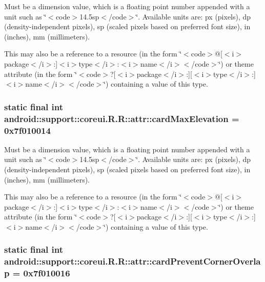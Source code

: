 Must be a dimension value, which is a floating point number appended with a unit such as \char`\"{}$<$code$>$14.5sp$<$/code$>$\char`\"{}. Available units are: px (pixels), dp (density-independent pixels), sp (scaled pixels based on preferred font size), in (inches), mm (millimeters). 

This may also be a reference to a resource (in the form \char`\"{}$<$code$>$@\mbox{[}$<$i$>$package$<$/i$>$:\mbox{]}$<$i$>$type$<$/i$>$:$<$i$>$name$<$/i$>$$<$/code$>$\char`\"{}) or theme attribute (in the form \char`\"{}$<$code$>$?\mbox{[}$<$i$>$package$<$/i$>$:\mbox{]}\mbox{[}$<$i$>$type$<$/i$>$:\mbox{]}$<$i$>$name$<$/i$>$$<$/code$>$\char`\"{}) containing a value of this type. \hypertarget{classandroid_1_1support_1_1coreui_1_1_r_1_1attr_0b3ead5ededfc7aa2b9083c1c0a5d37b}{
\subsubsection[{cardMaxElevation}]{\setlength{\rightskip}{0pt plus 5cm}static final int android::support::coreui.R.R::attr::cardMaxElevation = 0x7f010014}}
\label{classandroid_1_1support_1_1coreui_1_1_r_1_1attr_0b3ead5ededfc7aa2b9083c1c0a5d37b}


Must be a dimension value, which is a floating point number appended with a unit such as \char`\"{}$<$code$>$14.5sp$<$/code$>$\char`\"{}. Available units are: px (pixels), dp (density-independent pixels), sp (scaled pixels based on preferred font size), in (inches), mm (millimeters). 

This may also be a reference to a resource (in the form \char`\"{}$<$code$>$@\mbox{[}$<$i$>$package$<$/i$>$:\mbox{]}$<$i$>$type$<$/i$>$:$<$i$>$name$<$/i$>$$<$/code$>$\char`\"{}) or theme attribute (in the form \char`\"{}$<$code$>$?\mbox{[}$<$i$>$package$<$/i$>$:\mbox{]}\mbox{[}$<$i$>$type$<$/i$>$:\mbox{]}$<$i$>$name$<$/i$>$$<$/code$>$\char`\"{}) containing a value of this type. \hypertarget{classandroid_1_1support_1_1coreui_1_1_r_1_1attr_2a3f1d42caca02feb9e768360f8a6eb5}{
\subsubsection[{cardPreventCornerOverlap}]{\setlength{\rightskip}{0pt plus 5cm}static final int android::support::coreui.R.R::attr::cardPreventCornerOverlap = 0x7f010016}}
\label{classandroid_1_1support_1_1coreui_1_1_r_1_1attr_2a3f1d42caca02feb9e768360f8a6eb5}


